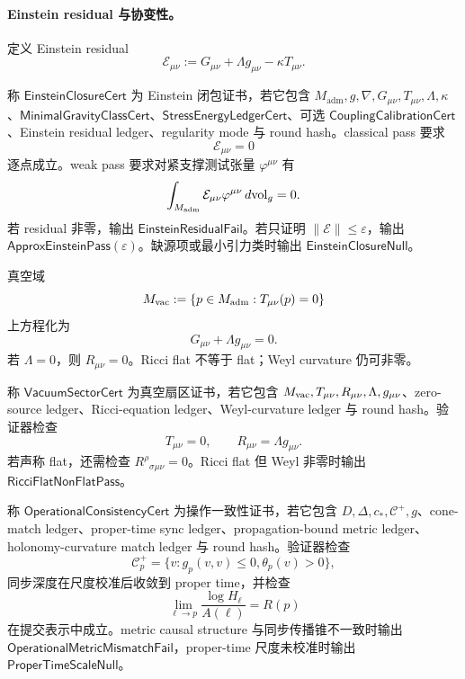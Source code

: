 \paragraph{Einstein residual 与协变性。}
定义 Einstein residual
\[
\boxed{
\mathcal E_{\mu\nu}
:=
G_{\mu\nu}+\Lambda g_{\mu\nu}-\kappa T_{\mu\nu}.
}
\]

\begin{definition}\label{def:typed-address-biaxial-completion-einstein-closure-cert}
称 \(\mathsf{EinsteinClosureCert}\) 为 Einstein 闭包证书，若它包含 \(M_{\mathrm{adm}},g,\nabla,G_{\mu\nu},T_{\mu\nu},\Lambda,\kappa\)、\(\mathsf{MinimalGravityClassCert}\)、\(\mathsf{StressEnergyLedgerCert}\)、可选 \(\mathsf{CouplingCalibrationCert}\)、Einstein residual ledger、regularity mode 与 round hash。classical pass 要求
\[
\mathcal E_{\mu\nu}=0
\]
逐点成立。weak pass 要求对紧支撑测试张量 \(\varphi^{\mu\nu}\) 有
\[
\int_{M_{\mathrm{adm}}}
\mathcal E_{\mu\nu}\varphi^{\mu\nu}\,d{\rm vol}_g=0.
\]
若 residual 非零，输出 \(\mathsf{EinsteinResidualFail}\)。若只证明 \(\|\mathcal E\|\le\varepsilon\)，输出 \(\mathsf{ApproxEinsteinPass}(\varepsilon)\)。缺源项或最小引力类时输出 \(\mathsf{EinsteinClosureNull}\)。
\end{definition}

真空域
\[
M_{\rm vac}:=\{p\in M_{\mathrm{adm}}:T_{\mu\nu}(p)=0\}
\]
上方程化为
\[
G_{\mu\nu}+\Lambda g_{\mu\nu}=0.
\]
若 \(\Lambda=0\)，则 \(R_{\mu\nu}=0\)。Ricci flat 不等于 flat；Weyl curvature 仍可非零。

\begin{definition}[真空扇区证书]\label{def:typed-address-biaxial-completion-vacuum-sector-cert}
称 \(\mathsf{VacuumSectorCert}\) 为真空扇区证书，若它包含 \(M_{\rm vac},T_{\mu\nu},R_{\mu\nu},\Lambda,g_{\mu\nu}\)、zero-source ledger、Ricci-equation ledger、Weyl-curvature ledger 与 round hash。验证器检查
\[
T_{\mu\nu}=0,
\qquad
R_{\mu\nu}=\Lambda g_{\mu\nu}.
\]
若声称 flat，还需检查 \(R^\rho{}_{\sigma\mu\nu}=0\)。Ricci flat 但 Weyl 非零时输出 \(\mathsf{RicciFlatNonFlatPass}\)。
\end{definition}

\begin{definition}[操作一致性证书]\label{def:typed-address-biaxial-completion-operational-consistency-cert}
称 \(\mathsf{OperationalConsistencyCert}\) 为操作一致性证书，若它包含 \(D,\Delta,c_\ast,\mathcal C^+,g\)、cone-match ledger、proper-time sync ledger、propagation-bound metric ledger、holonomy-curvature match ledger 与 round hash。验证器检查
\[
\mathcal C_p^+=\{v:g_p(v,v)\le0,\theta_p(v)>0\},
\]
同步深度在尺度校准后收敛到 proper time，并检查
\[
\lim_{\ell\to p}\frac{\log H_\ell}{A(\ell)}=R(p)
\]
在提交表示中成立。metric causal structure 与同步传播锥不一致时输出 \(\mathsf{OperationalMetricMismatchFail}\)，proper-time 尺度未校准时输出 \(\mathsf{ProperTimeScaleNull}\)。
\end{definition}

